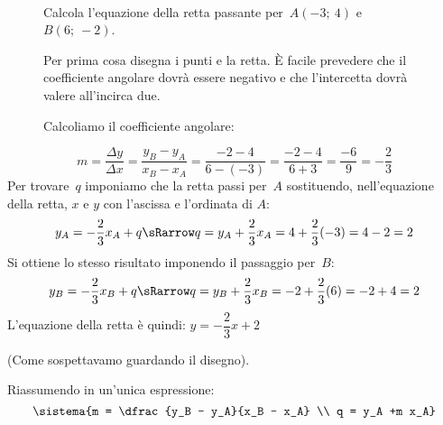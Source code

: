  \begin{esempio}
~

\begin{inaccessibleblock}
 \begin{figure}[h]
\centering \hspace{-5mm}
 \begin{minipage}[]{.40\textwidth}
Calcola l'equazione della retta passante per~\(A(-3;~4)\) e~\(B(6;~-2)\).

\vspace{1em}
Per prima cosa disegna i punti e la retta. È facile prevedere che il 
coefficiente angolare dovrà essere negativo e che l'intercetta dovrà valere
all'incirca due.

\vspace{1em}
Calcoliamo il coefficiente angolare:
 \end{minipage}
 \begin{minipage}[]{.60\textwidth}
   \centering \rettac
 \end{minipage}
\label{fig:rettac}
\end{figure}
\end{inaccessibleblock}
\[m = \frac{\Delta y}{\Delta x} = \frac{y_B - y_A}{x_B - x_A} =
      \frac{-2 - 4}{6 -(-3)} = \frac{-2 - 4}{6 + 3} = \frac{-6}{9} = 
      - \frac{2}{3}
\]
Per trovare~\(q\) imponiamo che la retta passi per~\(A\) sostituendo, 
nell'equazione della retta, \(x\) e \(y\) con l'ascissa e l'ordinata di \(A\): 
\[y_A = - \dfrac{2}{3} x_A + q \sRarrow 
    q = y_A +\dfrac{2}{3} x_A = 4 +\dfrac{2}{3} (-3) = 4 - 2 = 2\]
Si ottiene lo stesso risultato imponendo il passaggio per~\(B\): 
\[y_B = - \dfrac{2}{3} x_B + q \sRarrow 
    q = y_B +\dfrac{2}{3} x_B = -2 +\dfrac{2}{3} (6) = -2 +4 = 2\]
\noindent L'equazione della retta è quindi: \quad
\(y = - \dfrac{2}{3} x + 2\) 

(Come sospettavamo guardando il disegno).
 \end{esempio}
 Riassumendo in un'unica espressione:
 \[\sistema{m = \dfrac{y_B - y_A}{x_B - x_A} \\ q = y_A +m x_A}\]

% 


